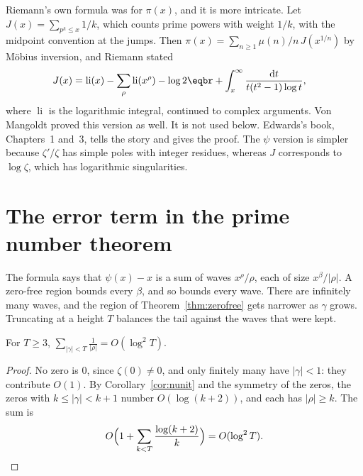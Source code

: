 
\begin{remark}
Riemann's own formula was for $\pi(x)$, and it is more intricate. Let $J(x)=\sum_{p^k\le x}1/k$, which counts prime powers with weight $1/k$, with the midpoint convention at the jumps. Then $\pi(x)=\sum_{n\ge1}\mu(n)/n\,J(x^{1/n})$ by M\"obius inversion, and Riemann stated
\[
\begin{aligned}J(x)&=\operatorname{li}(x)-\sum_\rho\operatorname{li}(x^\rho)-\log2\eqbr+\int_x^\infty\frac{\mathrm dt}{t(t^2-1)\log t},\end{aligned}
\]
where $\operatorname{li}$ is the logarithmic integral, continued to complex arguments. Von Mangoldt proved this version as well. It is not used below. Edwards's book, Chapters~1 and~3, tells the story and gives the proof. The $\psi$ version is simpler because $\zeta'/\zeta$ has simple poles with integer residues, whereas $J$ corresponds to $\log\zeta$, which has logarithmic singularities.
\end{remark}

\section{The error term in the prime number theorem}

The formula says that $\psi(x)-x$ is a sum of waves $x^\rho/\rho$, each of size $x^\beta/|\rho|$. A zero-free region bounds every $\beta$, and so bounds every wave. There are infinitely many waves, and the region of Theorem~\ref{thm:zerofree} gets narrower as $\gamma$ grows. Truncating at a height $T$ balances the tail against the waves that were kept.

\begin{lemma}\label{lem:sumrho}
For $T\ge3$, $\displaystyle\sum_{|\gamma|<T}\frac1{|\rho|}=O(\log^2T)$.
\end{lemma}
\begin{proof}
No zero is $0$, since $\zeta(0)\ne0$, and only finitely many have $|\gamma|<1$: they contribute $O(1)$. By Corollary~\ref{cor:nunit} and the symmetry of the zeros, the zeros with $k\le|\gamma|<k+1$ number $O(\log(k+2))$, and each has $|\rho|\ge k$. The sum is
\[
O\Bigl(1+\sum_{k<T}\frac{\log(k+2)}k\Bigr)=O(\log^2T).
\]
\end{proof}

